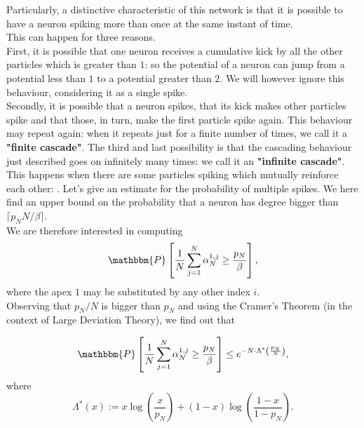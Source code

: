 \documentclass[11pt, a4paper]{article}
\begin{document}
Particularly, a distinctive characteristic of this network is that it is possible to have a neuron spiking more than once at the same instant of time. \\
This can happen for three reasons. \\
First, it is possible that one neuron receives a cumulative kick by all the other particles which is greater than $1$: so the potential of a neuron can jump from a potential less than $1$ to a potential greater than $2$. We will however ignore this behaviour, considering it as a single spike. \\
Secondly, it is possible that a neuron spikes, that its kick makes other particles spike and that those, in turn, make the first particle spike again. This behaviour may repeat again: when it repeats just for a finite number of times, we call it a \textbf{"finite cascade"}.
The third and last possibility is that the cascading behaviour just described goes on infinitely many times: we call it an \textbf{"infinite cascade"}. This happens when there are some particles spiking which mutually reinforce each other: .
Let's give an estimate for the probability of multiple spikes.
We here find an upper bound on the probability that a neuron has degree bigger than $\lceil p_N N / \beta \rceil$. \\
We are therefore interested in computing \[ \mathbbm{P} \left[ \frac{1}{N} \sum_{j = 1}^N \alpha^{1, j}_N \geq \frac{p_N}{\beta} \right], \] where the apex $1$ may be substituted by any other index $i$. \\


Observing that $p_N / N$ is bigger than $p_N$ and using the Cramer's Theorem (in the context of Large Deviation Theory), we find out that 

\begin{equation}\label{upperbound}
\mathbbm{P} \left[ \frac{1}{N} \sum_{j = 1}^N \alpha^{1, j}_N \geq \frac{p_N}{\beta} \right] \leq e^{- N \cdot \Lambda^* \left( \frac{p_N}{N} \right) }, \end{equation}
 where \[ \Lambda^*(x) := x \log \left( \frac{x}{p_N} \right) + (1-x) \log \left( \frac{1 - x}{1 - p_N} \right).\]
\end{document}
